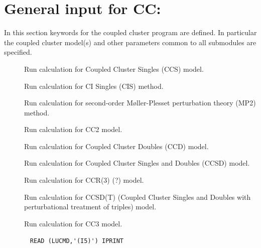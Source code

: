 \section{General input for CC: }\label{sec:ccgeneral}

In this section keywords for the coupled
cluster program are defined. In particular the coupled cluster 
model(s) and other parameters common to all submodules are specified.

\begin{description}
\item[] 
        Run calculation for Coupled Cluster Singles
        (CCS) model. 
         
%
%
%
\item[]    
        Run calculation for CI Singles (CIS) method. 
%
\item[]    
        Run calculation for second-order M{\o}ller-Plesset 
        perturbation theory (MP2) method. 
%
\item[]    
        Run calculation for CC2 model. 
%
%
\item[]    
        Run calculation for Coupled Cluster Doubles
        (CCD) model. 
%
\item[]   
        Run calculation for Coupled Cluster Singles and Doubles
        (CCSD) model.
%
%
%

\item[] 
        Run calculation for CCR(3) (?) model.
%
%
\item[]  
        Run calculation for CCSD(T) (Coupled Cluster Singles and 
        Doubles with perturbational treatment of triples) model.
%
\item[]     
        Run calculation for CC3 model.
%
\item[]  \verb| |\newline
\verb|READ (LUCMD,'(I5)') IPRINT|


\end{description}
